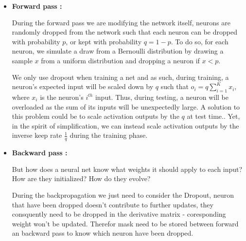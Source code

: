 \begin{itemize}[topsep=-10pt]
\item \textbf{Forward pass :} 

During the forward pass we are modifying the network itself,
neurons are randomly dropped from the network such that each neuron can be dropped with probability $p$,
or kept with probability $q = 1- p$.
To do so, for each neuron, we simulate a draw from a Bernoulli distribution by drawing a sample $x$ from a uniform distribution
and dropping a neuron if $x < p$.

We only use dropout when training a net and as such, during training, a neuron's expected input will be scaled down by $q$ such that $o_i = q\sum_{i=1}^K x_i$, where $x_i$ is the neuron's $i^{th}$ input.
Thus, during testing, a neuron will be overloaded as the sum of its inputs will be unexpectedly large.
A solution to this problem could be to scale activation outputs by the $q$ at test time..
Yet, in the spirit of simplification,
we can instead scale activation outputs by the inverse keep rate $\frac{1}{q}$ during the training phase.


\item \textbf{Backward pass :} 

But how does a neural net know what weights it should apply to each input?
How are they initialized?
How do they evolve?
   

During the backpropagation we just need to consider the Dropout, neuron that have been dropped doesn't contribute to further updates, they consquently need to be dropped in the derivative matrix - coresponding weight won't be updated. Therefor mask need to be stored between forward an backward pass to know which neuron have been dropped.

\end{itemize}



